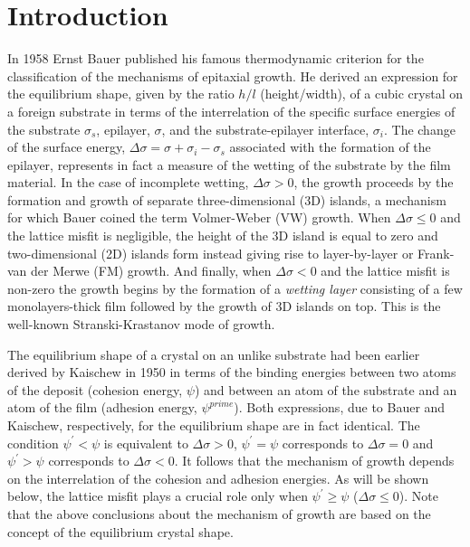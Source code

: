 \documentclass[aps,prl,showpacs,twocolumn,byrevtex,floatfix]{revtex4-1}
\begin{document}
\pacs{}

\maketitle



\section{Introduction}



In 1958 Ernst Bauer published his famous thermodynamic criterion for the
classification of the mechanisms of epitaxial growth.\cite{Bauer58,Kern79} He
derived an expression for the equilibrium shape, given by the ratio $h/l$ (height/width),
of a cubic crystal on a foreign substrate in terms of the interrelation of the
specific surface energies of the substrate $\sigma_s$, epilayer, $\sigma$, and
the substrate-epilayer interface, $\sigma_i$. The change of the surface energy,
$\Delta \sigma = \sigma + \sigma_i - \sigma_s$ associated with the
formation of the epilayer, represents in fact a measure of the wetting of
the substrate
by the film material. In the case of incomplete wetting, $\Delta \sigma > 0$,
the growth proceeds by the formation and growth of separate
three-dimensional (3D) islands, a mechanism for which Bauer coined the
term Volmer-Weber (VW) growth.\cite{Volmer26}
When $\Delta \sigma \le 0$ and the lattice misfit is negligible, the height of
the 3D island is equal to zero and two-dimensional (2D) islands form
instead giving rise to layer-by-layer or Frank-van der Merwe (FM)
growth.\cite{Frank49,Frank491} And finally, when $\Delta \sigma < 0$ and the
lattice misfit is non-zero the growth begins by the formation of
a {\it wetting layer} consisting of a few monolayers-thick film followed by
the growth of 3D islands on top.  This is the well-known
Stranski-Krastanov mode of growth.\cite{Stranski39}

The equilibrium shape of a crystal on an unlike substrate had been earlier
derived by Kaischew in 1950 in terms of the binding energies between two
atoms of the deposit (cohesion energy, $\psi$) and between an atom of the 
substrate and an atom of the film (adhesion energy, 
$\psi^{prime}$).\cite{Kaischew50,Kaischew60} Both expressions, due to Bauer 
and Kaischew, respectively, for the equilibrium shape are in fact 
identical.\cite{Markov17} The condition
$\psi^{\prime} < \psi$ is equivalent to $\Delta \sigma > 0$, $\psi^{\prime} =
\psi$ corresponds to $\Delta \sigma = 0$ and $\psi^{\prime} > \psi$ corresponds
to $\Delta \sigma < 0$. It follows that the mechanism of growth depends
on the interrelation of the cohesion and adhesion energies. As will be shown
below, the lattice misfit plays a crucial role only when 
$\psi^{\prime} \ge \psi$
($\Delta \sigma \le 0$). Note that the above conclusions about the mechanism of
growth are based on the concept of the equilibrium crystal shape.
\end{document}

